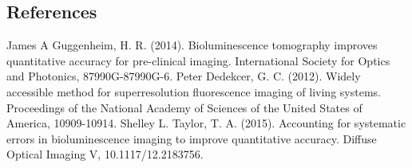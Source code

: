 \documentclass[a4paper]{article}
\begin{document}
\begin{multicols*}{2}
\section*{References}

James A Guggenheim, H. R. (2014). Bioluminescence tomography improves quantitative accuracy for pre-clinical imaging. International Society for Optics and Photonics, 87990G-87990G-6.
Peter Dedekcer, G. C. (2012). Widely accessible method for superresolution fluorescence imaging of living systems. Proceedings of the National Academy of Sciences of the United States of America, 10909-10914.
Shelley L. Taylor, T. A. (2015). Accounting for systematic errors in bioluminescence imaging to improve quantitative accuracy. Diffuse Optical Imaging V, 10.1117/12.2183756.

\end{multicols*}
\end{document}

